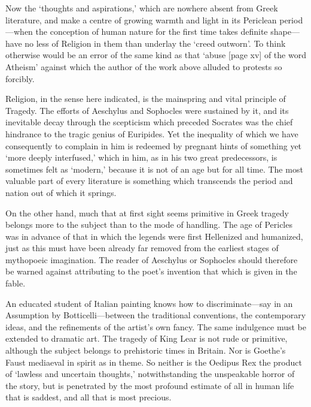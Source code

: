 \documentclass[11pt,letter]{book}
\begin{document}
\par  Now the ‘thoughts and aspirations,’ which are nowhere absent from Greek literature, and make a centre of growing warmth and light in its Periclean period—when the conception of human nature for the first time takes definite shape—have no less of Religion in them than underlay the ‘creed outworn’. To think otherwise would be an error of the same kind as that ‘abuse [page xv] of the word Atheism’ against which the author of the work above alluded to protests so forcibly.

\par  Religion, in the sense here indicated, is the mainspring and vital principle of Tragedy. The efforts of Aeschylus and Sophocles were sustained by it, and its inevitable decay through the scepticism which preceded Socrates was the chief hindrance to the tragic genius of Euripides. Yet the inequality of which we have consequently to complain in him is redeemed by pregnant hints of something yet ‘more deeply interfused,’ which in him, as in his two great predecessors, is sometimes felt as ‘modern,’ because it is not of an age but for all time. The most valuable part of every literature is something which transcends the period and nation out of which it springs.

\par  On the other hand, much that at first sight seems primitive in Greek tragedy belongs more to the subject than to the mode of handling. The age of Pericles was in advance of that in which the legends were first Hellenized and humanized, just as this must have been already far removed from the earliest stages of mythopoeic imagination. The reader of Aeschylus or Sophocles should therefore be warned against attributing to the poet’s invention that which is given in the fable.

\par  An educated student of Italian painting knows how to discriminate—say in an Assumption by Botticelli—between the traditional conventions, the contemporary ideas, and the refinements of the artist’s own fancy. The same indulgence must be extended to dramatic art. The tragedy of King Lear is not rude or primitive, although the subject belongs to prehistoric times in Britain. Nor is Goethe’s Faust mediaeval in spirit as in theme. So neither is the Oedipus Rex the product of ‘lawless and uncertain thoughts,’ notwithstanding the unspeakable horror of the story, but is penetrated by the most profound estimate of all in human life that is saddest, and all that is most precious.
\end{document}
